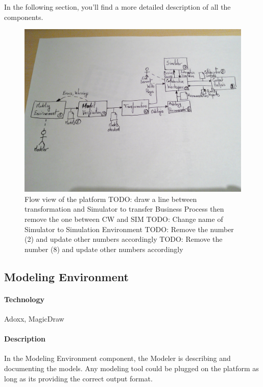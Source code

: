 \documentclass{learnpad}
\begin{document}
In the following section, you'll find a more detailed description of all the
components.

\begin{figure}[!htp]
	\centering
	\includegraphics[width=.6\paperwidth,keepaspectratio]{figures/learnpad-flow.jpg}
	\caption{Flow view of the \learnpad platform\newline
	TODO: draw a line between transformation and Simulator to transfer Business Process then remove the one between CW and SIM\newline
	TODO: Change name of Simulator to Simulation Environment\newline
	TODO: Remove the number (2) and update other numbers accordingly\newline
	TODO: Remove the number (8) and update other numbers accordingly}
	\label{fig:flow-view}
\end{figure}

\subsection{Modeling Environment}
\label{sec:modeling-environment}

\paragraph{Technology}
Adoxx, MagicDraw

\paragraph{Description}
In the Modeling Environment component, the Modeler is describing and documenting
the models.  Any modeling tool could be plugged on the \learnpad platform as
long as its providing the correct output format.
\end{document}
